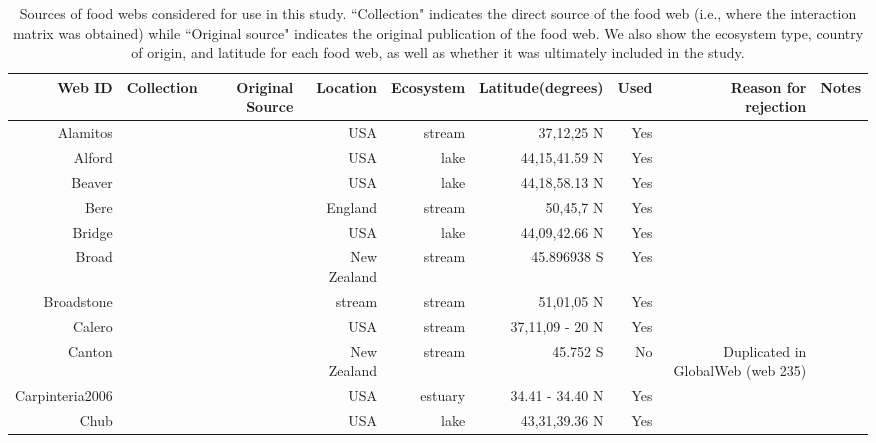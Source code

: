 \documentclass[12pt]{article}
\begin{document}
\newpage
\begin{landscape}

  \begin{table}[h!]
  \centering
  \caption{Sources of food webs considered for use in this study. ``Collection" indicates the direct source of the
  food web (i.e., where the interaction matrix was obtained) while ``Original source" indicates the original publication
  of the food web. We also show the ecosystem type, country of origin, and latitude for each food web, as well as whether
  it was ultimately included in the study.  }
  \label{S1}
    \begin{tabular}{rrrrrrrrr}
      \hline
      Web ID & Collection & Original Source & Location & Ecosystem & Latitude(degrees) & Used  & Reason for rejection & Notes \\
      \hline
      Alamitos & ~\citet{Riede2011} & ~\citet{Harrison1995} & USA   & stream & 37,12,25 N & Yes   &       &  \\
      Alford & ~\citet{Riede2011} & ~\citet{Havens1992} & USA   & lake  & 44,15,41.59 N & Yes   &       &  \\
      Beaver & ~\citet{Riede2011} & ~\citet{Havens1992} & USA   & lake  & 44,18,58.13 N & Yes   &       &  \\
      Bere  & ~\citet{Riede2011} & ~\citet{Woodward2008} & England & stream & 50,45,7 N & Yes   &       &  \\
      Bridge & ~\citet{Riede2011} & ~\citet{Havens1992} & USA   & lake  & 44,09,42.66 N & Yes   &       &  \\
      Broad & ~\citet{Riede2011} & ~\citet{Townsend1998} & New Zealand & stream & 45.896938 S & Yes   &       &  \\
      Broadstone & ~\citet{Riede2011} & ~\citet{Woodward2005} & stream & stream & 51,01,05 N & Yes   &       &  \\
      Calero & ~\citet{Riede2011} & ~\citet{Harrison1995} & USA   & stream & 37,11,09 - 20 N & Yes   &       &  \\
      Canton & ~\citet{Riede2011} & ~\citet{Townsend1998} & New Zealand & stream & 45.752 S & No    & Duplicated in GlobalWeb (web 235) &  \\
      Carpinteria2006 & ~\citet{Riede2011} & ~\citet{Lafferty2006} & USA   & estuary & 34.41 - 34.40 N & Yes   &       &  \\
      Chub  & ~\citet{Riede2011} & ~\citet{Havens1992} & USA   & lake  & 43,31,39.36 N & Yes   &       &  \\

\end{tabular}
\end{table}
\end{landscape}
\end{document}
